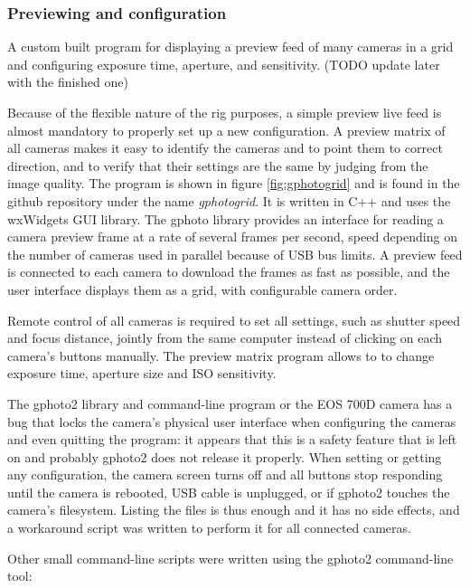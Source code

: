 
\subsubsection{Previewing and configuration} %

{A custom built program for displaying a preview feed of many cameras in a grid and configuring exposure time, aperture, and sensitivity. (TODO update later with the finished one)}

Because of the flexible nature of the rig purposes, a simple preview live feed is almost mandatory to properly set up a new configuration.
A preview matrix of all cameras makes it easy to identify the cameras and to point them to correct direction, and to verify that their settings are the same by judging from the image quality.
The program is shown in figure \ref{fig:gphotogrid} and is found in the github repository under the name \emph{gphotogrid}.
It is written in C++ and uses the wxWidgets GUI library.
The gphoto library provides an interface for reading a camera preview frame at a rate of several frames per second, speed depending on the number of cameras used in parallel because of USB bus limits.
A preview feed is connected to each camera to download the frames as fast as possible, and the user interface displays them as a grid, with configurable camera order.

Remote control of all cameras is required to set all settings, such as shutter speed and focus distance, jointly from the same computer instead of clicking on each camera's buttons manually.
The preview matrix program allows to to change exposure time, aperture size and ISO sensitivity.

The gphoto2 library and command-line program or the EOS 700D camera has a bug that locks the camera's physical user interface when configuring the cameras and even quitting the program:
it appears that this is a safety feature that is left on and probably gphoto2 does not release it properly.
When setting or getting any configuration, the camera screen turns off and all buttons stop responding until the camera is rebooted, USB cable is unplugged, or if gphoto2 touches the camera's filesystem.
Listing the files is thus enough and it has no side effects, and a workaround script was written to perform it for all connected cameras.

Other small command-line scripts were written using the gphoto2 command-line tool:

